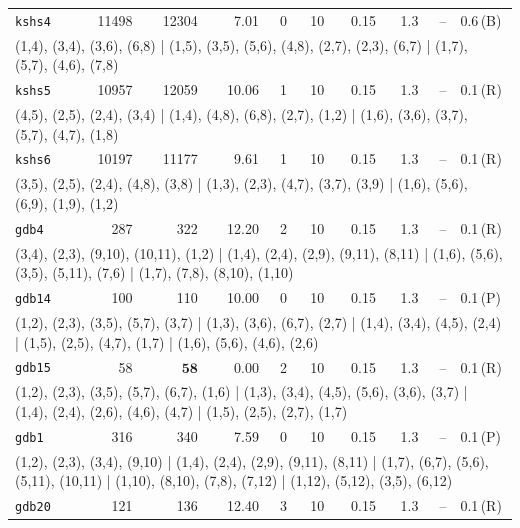 \begin{longtable}{lrrrrrrrrl}
\texttt{kshs4} & 11498 & 12304 & 7.01 & 0 & 10 & 0.15 & 1.3 & -- & 0.6\,(B) \\
\multicolumn{10}{p{0.96\linewidth}}{\tiny\raggedright\arraybackslash (1,4), (3,4), (3,6), (6,8) | (1,5), (3,5), (5,6), (4,8), (2,7), (2,3), (6,7) | (1,7), (5,7), (4,6), (7,8)} \\[2pt]
\texttt{kshs5} & 10957 & 12059 & 10.06 & 1 & 10 & 0.15 & 1.3 & -- & 0.1\,(R) \\
\multicolumn{10}{p{0.96\linewidth}}{\tiny\raggedright\arraybackslash (4,5), (2,5), (2,4), (3,4) | (1,4), (4,8), (6,8), (2,7), (1,2) | (1,6), (3,6), (3,7), (5,7), (4,7), (1,8)} \\[2pt]
\texttt{kshs6} & 10197 & 11177 & 9.61 & 1 & 10 & 0.15 & 1.3 & -- & 0.1\,(R) \\
\multicolumn{10}{p{0.96\linewidth}}{\tiny\raggedright\arraybackslash (3,5), (2,5), (2,4), (4,8), (3,8) | (1,3), (2,3), (4,7), (3,7), (3,9) | (1,6), (5,6), (6,9), (1,9), (1,2)} \\[2pt]
\texttt{gdb4} & 287 & 322 & 12.20 & 2 & 10 & 0.15 & 1.3 & -- & 0.1\,(R) \\
\multicolumn{10}{p{0.96\linewidth}}{\tiny\raggedright\arraybackslash (3,4), (2,3), (9,10), (10,11), (1,2) | (1,4), (2,4), (2,9), (9,11), (8,11) | (1,6), (5,6), (3,5), (5,11), (7,6) | (1,7), (7,8), (8,10), (1,10)} \\[2pt]
\texttt{gdb14} & 100 & 110 & 10.00 & 0 & 10 & 0.15 & 1.3 & -- & 0.1\,(P) \\
\multicolumn{10}{p{0.96\linewidth}}{\tiny\raggedright\arraybackslash (1,2), (2,3), (3,5), (5,7), (3,7) | (1,3), (3,6), (6,7), (2,7) | (1,4), (3,4), (4,5), (2,4) | (1,5), (2,5), (4,7), (1,7) | (1,6), (5,6), (4,6), (2,6)} \\[2pt]
\texttt{gdb15} & 58 & $\mathbf{58}$ & 0.00 & 2 & 10 & 0.15 & 1.3 & -- & 0.1\,(R) \\
\multicolumn{10}{p{0.96\linewidth}}{\tiny\raggedright\arraybackslash (1,2), (2,3), (3,5), (5,7), (6,7), (1,6) | (1,3), (3,4), (4,5), (5,6), (3,6), (3,7) | (1,4), (2,4), (2,6), (4,6), (4,7) | (1,5), (2,5), (2,7), (1,7)} \\[2pt]
\texttt{gdb1} & 316 & 340 & 7.59 & 0 & 10 & 0.15 & 1.3 & -- & 0.1\,(P) \\
\multicolumn{10}{p{0.96\linewidth}}{\tiny\raggedright\arraybackslash (1,2), (2,3), (3,4), (9,10) | (1,4), (2,4), (2,9), (9,11), (8,11) | (1,7), (6,7), (5,6), (5,11), (10,11) | (1,10), (8,10), (7,8), (7,12) | (1,12), (5,12), (3,5), (6,12)} \\[2pt]
\texttt{gdb20} & 121 & 136 & 12.40 & 3 & 10 & 0.15 & 1.3 & -- & 0.1\,(R) \\

\end{longtable}
